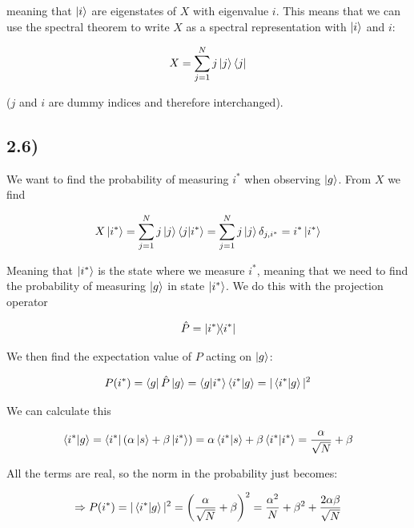 \documentclass[a4paper,norsk, 10pt]{article}
\begin{document}
meaning that $\ket{i}$ are eigenstates of $X$ with eigenvalue $i$. This means that we can use the spectral theorem to write $X$ as a spectral representation with $\ket{i}$ and $i$:

\begin{equation}
X = \sum_{j=1}^N j\ket{j}\bra{j}
\end{equation}

($j$ and $i$ are dummy indices and therefore interchanged).

\subsection{2.6)}

We want to find the probability of measuring $i^*$ when observing $\ket{g}$. From $X$ we find

\begin{equation}
X\ket{i^*} =\sum_{j=1}^N j\ket{j}\bra{j}\ket{i^*} = \sum_{j=1}^N j\ket{j}\delta_{j,i^*} = i^*\ket{i^*} 
\end{equation}

Meaning that $\ket{i^*}$ is the state where we measure $i^*$, meaning that we need to find the probability of measuring $\ket{g}$ in state $\ket{i^*}$. We do this with the projection operator

\begin{equation}
\hat{P} = \ketbra{i^*}{i^*}
\end{equation}

We then find the expectation value of $P$ acting on $\ket{g}$:

\begin{equation}
P(i^*) = \bra{g}\hat{P}\ket{g} = \bra{g}\ket{i^*}\bra{i^*}\ket{g} = |\braket{i^*}{g}|^2
\end{equation}

We can calculate this

\begin{equation}
\braket{i^*}{g} = \bra{i^*}(\alpha \ket{s} + \beta\ket{i^*}) = \alpha\braket{i^*}{s}+ \beta \braket{i^*}{i^*} = \frac{\alpha}{\sqrt{N}} + \beta
\end{equation}

All the terms are real, so the norm in the probability just becomes:

\begin{equation}
\Rightarrow P(i^*) = |\braket{i^*}{g}|^2 = \left(\frac{\alpha}{\sqrt{N}} + \beta\right)^2 = \frac{\alpha^2}{N} + \beta^2 + \frac{2\alpha\beta}{\sqrt{N}}
\end{equation}
\end{document}
